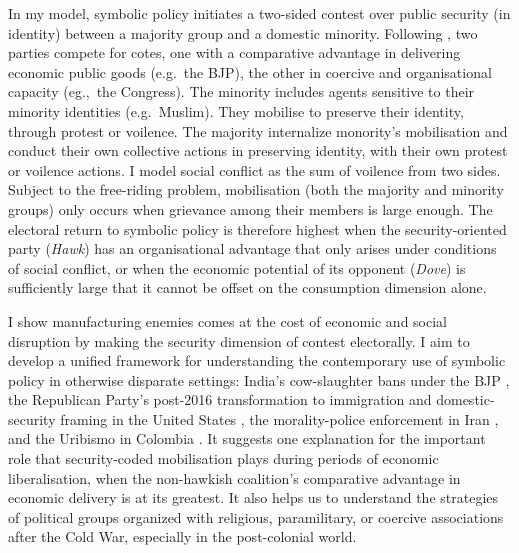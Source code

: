 \documentclass[11pt,twoside]{extarticle}
\begin{document}

In my model, symbolic policy initiates a two-sided contest over public security (in identity) between a majority group and a domestic minority. 
Following \citet*{baligaStrategyManipulatingConflict2012}, two parties compete for cotes, one with a comparative advantage in delivering economic public goods (e.g.\ the BJP), the other in coercive and organisational capacity (eg.,\ the Congress). 
The minority includes agents sensitive to their minority identities (e.g.\ Muslim). They mobilise to preserve their identity, through protest or voilence. 
The majority internalize monority's mobilisation and conduct their own collective actions in preserving identity, with their own protest or voilence actions.
I model social conflict as the sum of voilence from two sides.
Subject to the free-riding problem, mobilisation (both the majority and minority groups) only occurs when grievance among their members is large enough.
The electoral return to symbolic policy is therefore highest when the security-oriented party (\emph{Hawk}) has an organisational advantage that only arises under conditions of social conflict, or when the economic potential of its opponent (\emph{Dove}) is sufficiently large that it cannot be offset on the consumption dimension alone.


I show manufacturing enemies comes at the cost of economic and social disruption by making the security dimension of contest electorally. I aim to develop a unified framework for understanding the contemporary use of symbolic policy in otherwise disparate settings: India's cow-slaughter bans under the BJP \citep{jaffrelotModisIndiaHindu2021}, the Republican Party's post-2016 transformation to immigration and domestic-security framing in the United States \citep{sidesIdentityCrisis20162019,mutzStatusThreatNot2018}, the morality-police enforcement in Iran \citep{bajoghliIranReframedAnxieties2020}, and the Uribismo in Colombia \citep*{acemogluMonopolyViolenceEvidence2013}. It suggests one explanation for the important role that security-coded mobilisation plays during periods of economic liberalisation, when the non-hawkish coalition's comparative advantage in economic delivery is at its greatest. It also helps us to understand the strategies of political groups organized with religious, paramilitary, or coercive associations after the Cold War, especially in the post-colonial world.
\end{document}
